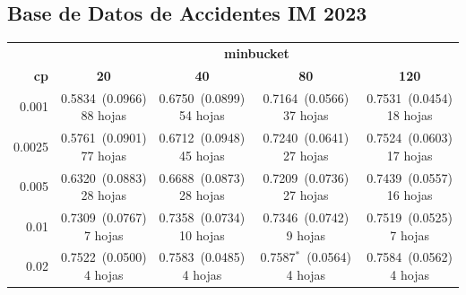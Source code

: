 \documentclass[twoside,a4paper,12pt,onecolumn,openany]{book}
\begin{document}
\vspace{0.0cm}
 
\subsection*{Base de Datos de Accidentes IM 2023}
 
\begin{table}[H]
\centering
\small
\setlength{\tabcolsep}{4pt}
\begin{tabular}{r|cccc}
\toprule
 & \multicolumn{4}{c}{\textbf{minbucket}} \\
\cmidrule(lr){2-5}
\textbf{cp} & \textbf{20} & \textbf{40} & \textbf{80} & \textbf{120} \\
\midrule
0.001 & \shortstack{0.5834~(0.0966)\\ 88 hojas} & \shortstack{0.6750~(0.0899)\\ 54 hojas} & \shortstack{0.7164~(0.0566)\\ 37 hojas} & \shortstack{0.7531~(0.0454)\\ 18 hojas} \\[4pt]
0.0025 & \shortstack{0.5761~(0.0901)\\ 77 hojas} & \shortstack{0.6712~(0.0948)\\ 45 hojas} & \shortstack{0.7240~(0.0641)\\ 27 hojas} & \shortstack{0.7524~(0.0603)\\ 17 hojas} \\[4pt]
0.005 & \shortstack{0.6320~(0.0883)\\ 28 hojas} & \shortstack{0.6688~(0.0873)\\ 28 hojas} & \shortstack{0.7209~(0.0736)\\ 27 hojas} & \shortstack{0.7439~(0.0557)\\ 16 hojas} \\[4pt]
0.01 & \shortstack{0.7309~(0.0767)\\ 7 hojas} & \shortstack{0.7358~(0.0734)\\ 10 hojas} & \shortstack{0.7346~(0.0742)\\ 9 hojas} & \shortstack{0.7519~(0.0525)\\ 7 hojas} \\[4pt]
0.02 & \shortstack{0.7522~(0.0500)\\ 4 hojas} & \shortstack{0.7583~(0.0485)\\ 4 hojas} & \shortstack{0.7587$^{*}$~(0.0564)\\ 4 hojas} & \shortstack{0.7584~(0.0562)\\ 4 hojas} \\[4pt]

\end{tabular}
\end{table}
\end{document}
